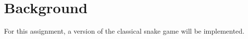 \documentclass[paper=usletter, fontsize=12pt]{article}
\begin{document}
    \vspace{-0.1in}

    \section{Background}
    For this assignment, a version of the classical snake game will be implemented.










\end{document}

